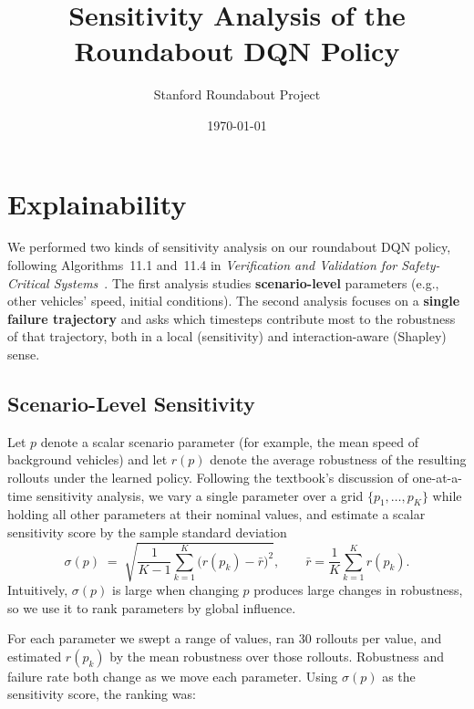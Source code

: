 \documentclass[11pt]{article}
\title{Sensitivity Analysis of the Roundabout DQN Policy}
\author{Stanford Roundabout Project}
\date{\today}
\begin{document}
\maketitle

\section{Explainability}

We performed two kinds of sensitivity analysis on our roundabout DQN policy,
following Algorithms~11.1 and~11.4 in \emph{Verification and Validation for
Safety-Critical Systems}~\cite{kochenderfer2025val}. The first analysis studies
\textbf{scenario-level} parameters (e.g., other vehicles' speed, initial
conditions). The second analysis focuses on a \textbf{single failure
trajectory} and asks which timesteps contribute most to the robustness of that
trajectory, both in a local (sensitivity) and interaction-aware (Shapley)
sense.

\subsection{Scenario-Level Sensitivity}

Let $p$ denote a scalar scenario parameter (for example, the mean speed of
background vehicles) and let $r(p)$ denote the average robustness of the
resulting rollouts under the learned policy. Following the textbook's
discussion of one-at-a-time sensitivity analysis, we vary a single parameter
over a grid $\{p_1,\dots,p_K\}$ while holding all other parameters at their
nominal values, and estimate a scalar sensitivity score by the sample standard
deviation
\begin{equation}
    \sigma(p)
    \;=\;
    \sqrt{
      \frac{1}{K-1}
      \sum_{k=1}^K
        \bigl(r(p_k) - \bar r\bigr)^2
    },
    \qquad
    \bar r = \frac{1}{K}\sum_{k=1}^K r(p_k).
\end{equation}
Intuitively, $\sigma(p)$ is large when changing $p$ produces large changes in
robustness, so we use it to rank parameters by global influence.

For each parameter we swept a range of values, ran $30$ rollouts per value, and
estimated $r(p_k)$ by the mean robustness over those rollouts. Robustness and
failure rate both change as we move each parameter. Using $\sigma(p)$ as the
sensitivity score, the ranking was:
\end{document}
